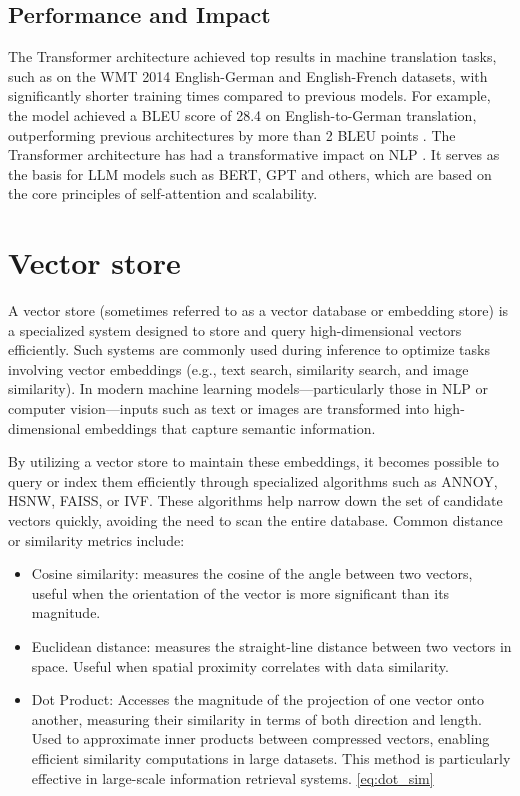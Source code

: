 



\subsection{Performance and Impact}  
The Transformer architecture achieved top results in machine translation tasks, such as on the WMT 2014 English-German and English-French datasets, with significantly shorter training times compared to previous models. For example, the model achieved a BLEU score of 28.4 on English-to-German translation, outperforming previous architectures by more than 2 BLEU points \cite{vaswani2017attention}.  
The Transformer architecture has had a transformative impact on \ac{NLP} . It serves as the basis for \ac{LLM} models such as BERT, GPT and others, which are based on the core principles of self-attention and scalability.


\section{Vector store}
A vector store (sometimes referred to as a vector database or embedding store) is a specialized system designed to store and query high-dimensional vectors efficiently. Such systems are commonly used during inference to optimize tasks involving vector embeddings (e.g., text search, similarity search, and image similarity). In modern machine learning models—particularly those in \ac{NLP} or computer vision—inputs such as text or images are transformed into high-dimensional embeddings that capture semantic information.

By utilizing a vector store to maintain these embeddings, it becomes possible to query or index them efficiently through specialized algorithms such as \ac{ANNOY}, \ac{HSNW}, \ac{FAISS}, or \ac{IVF}. These algorithms help narrow down the set of candidate vectors quickly, avoiding the need to scan the entire database. Common distance or similarity metrics include:
\begin{itemize}
    \item Cosine similarity: measures the cosine of the angle between two vectors, useful when the orientation of the vector is more significant than its magnitude. 
    \item Euclidean distance: measures the straight-line distance between two vectors in space. Useful when spatial proximity correlates with data similarity.
    \item Dot Product: Accesses the magnitude of the projection of one vector onto another, measuring their similarity in terms of both direction and length. Used to approximate inner products between compressed vectors, enabling efficient similarity computations in large datasets. This method is particularly effective in large-scale information retrieval systems. \ref{eq:dot_sim}
\end{itemize}

